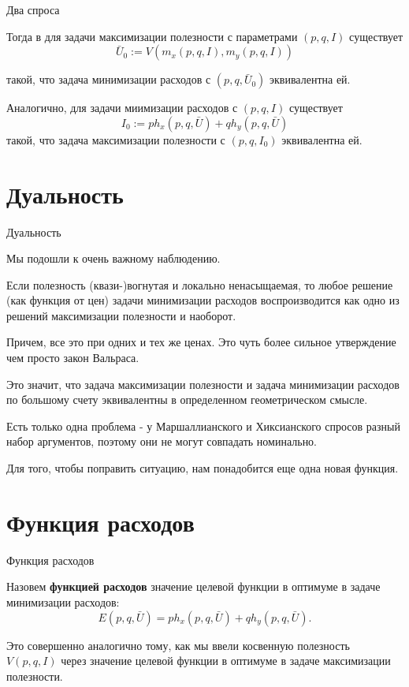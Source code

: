 \documentclass{beamer}
\begin{document}
\begin{frame}{Два спроса}

Тогда в для задачи максимизации полезности с параметрами $(p,q,I)$ существует 
$$ \bar U_0 := V(m_x(p,q,I), m_y(p,q,I))$$

такой, что задача минимизации расходов с $(p, q, \bar U_0)$ эквивалентна ей. 

Аналогично, для задачи миимизации расходов с $(p, q, I)$ существует
$$ I_0 := p h_x(p,q, \bar U) + q h_y(p,q, \bar U)$$
такой, что задача максимизации полезности с $(p, q, I_0)$ эквивалентна ей. 

\end{frame}

\section{Дуальность}

\begin{frame}{Дуальность}

Мы подошли к очень важному наблюдению.

\begin{theorem}[Дуальность]

Если полезность (квази-)вогнутая и локально ненасыщаемая, то любое решение (как функция от цен) задачи минимизации расходов воспроизводится как одно из решений максимизации полезности и наоборот.
\end{theorem}
Причем, все это при одних и тех же ценах. Это чуть более сильное утверждение чем просто закон Вальраса.

\end{frame}

\begin{frame}
Это значит, что задача максимизации полезности и задача минимизации расходов по большому счету эквивалентны в определенном геометрическом смысле. 

Есть только одна проблема - у Маршаллианского и Хиксианского спросов разный набор аргументов, поэтому они не могут совпадать номинально. 

Для того, чтобы поправить ситуацию, нам понадобится еще одна новая функция.
\end{frame}

\section{Функция расходов}

\begin{frame}{Функция расходов}

\begin{definition}
Назовем \textbf{функцией расходов} значение целевой функции в оптимуме в задаче минимизации расходов:
$$ E(p,q,\bar U) = p h_x(p,q,\bar U) + q h_y(p,q,\bar U).$$
\end{definition}

Это совершенно аналогично тому, как мы ввели косвенную полезность $V(p,q,I)$ через значение целевой функции в оптимуме в задаче максимизации полезности.
\end{frame}
\end{document}

